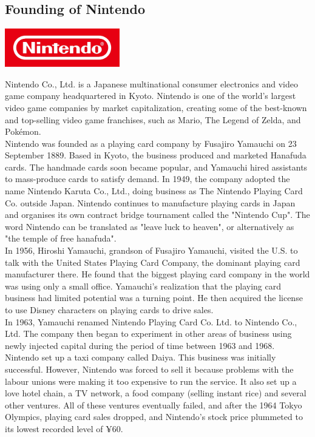 \documentclass[11pt]{report}
\begin{document}
\subsection{Founding of Nintendo}
\vspace{2mm}\begin{center}\includegraphics[width=5cm]{./img/nintendoLogo.jpg}\end{center}
Nintendo Co., Ltd. is a Japanese multinational consumer electronics and video game company headquartered in Kyoto. Nintendo is one of the world's largest video game companies by market capitalization, creating some of the best-known and top-selling video game franchises, such as Mario, The Legend of Zelda, and Pokémon.\\
\indent Nintendo was founded as a playing card company by Fusajiro Yamauchi on 23 September 1889. Based in Kyoto, the business produced and marketed Hanafuda cards. The handmade cards soon became popular, and Yamauchi hired assistants to mass-produce cards to satisfy demand. In 1949, the company adopted the name Nintendo Karuta Co., Ltd., doing business as The Nintendo Playing Card Co. outside Japan. Nintendo continues to manufacture playing cards in Japan and organises its own contract bridge tournament called the "Nintendo Cup". The word Nintendo can be translated as "leave luck to heaven", or alternatively as "the temple of free hanafuda".\\
\indent In 1956, Hiroshi Yamauchi, grandson of Fusajiro Yamauchi, visited the U.S. to talk with the United States Playing Card Company, the dominant playing card manufacturer there. He found that the biggest playing card company in the world was using only a small office. Yamauchi's realization that the playing card business had limited potential was a turning point. He then acquired the license to use Disney characters on playing cards to drive sales.\\
\indent In 1963, Yamauchi renamed Nintendo Playing Card Co. Ltd. to Nintendo Co., Ltd. The company then began to experiment in other areas of business using newly injected capital during the period of time between 1963 and 1968. Nintendo set up a taxi company called Daiya. This business was initially successful. However, Nintendo was forced to sell it because problems with the labour unions were making it too expensive to run the service. It also set up a love hotel chain, a TV network, a food company (selling instant rice) and several other ventures. All of these ventures eventually failed, and after the 1964 Tokyo Olympics, playing card sales dropped, and Nintendo's stock price plummeted to its lowest recorded level of ¥60.
\end{document}
